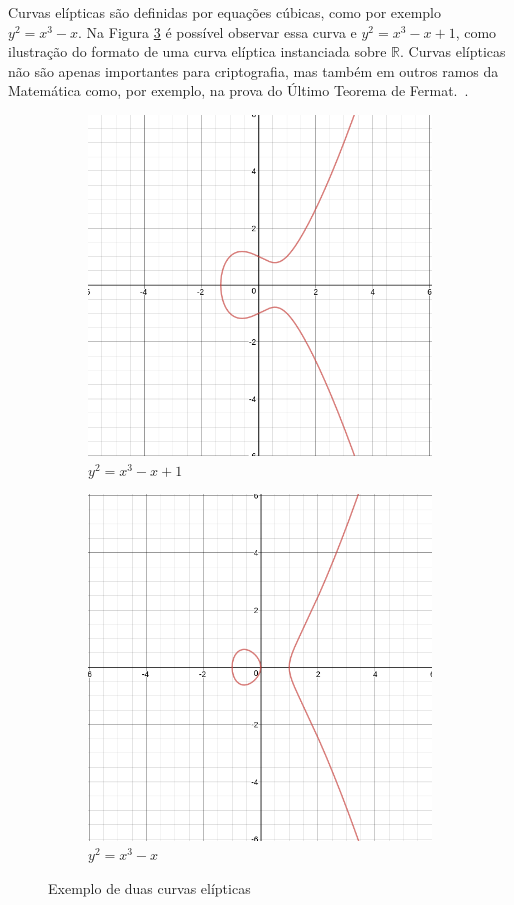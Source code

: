 Curvas elípticas são definidas por equações cúbicas, como por exemplo $y^2 = x^3 - x$. Na Figura \ref{fig:curvas} é possível observar essa curva e $y^2 = x^3 -x + 1$, como ilustração do formato de uma curva elíptica instanciada sobre $\mathbb{R}$. Curvas elípticas não são apenas importantes para criptografia, mas também em outros ramos da Matemática como, por exemplo, na  prova do Último Teorema de Fermat.~\cite{Hankerson:2003:GEC:940321}.
\begin{figure}[htpb]
\centering
\begin{subfigure}{.5\textwidth}
  \centering
  \includegraphics[width=.6\linewidth]{figures/curve1.png}
  \caption{$y^2 = x^3 -x + 1$}
  \label{fig:sub1}
\end{subfigure}%
\begin{subfigure}{.5\textwidth}
  \centering
  \includegraphics[width=.6\linewidth]{figures/curve2.png}
  \caption{$y^2 = x^3 - x$}
  \label{fig:sub2}
\end{subfigure}
\caption{Exemplo de duas curvas elípticas}
\label{fig:curvas}
\end{figure}

